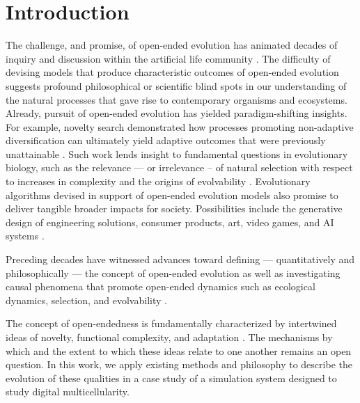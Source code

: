 \section{Introduction}

The challenge, and promise, of open-ended evolution has animated decades of inquiry and discussion within the artificial life community \citep{packard2019overview}.
The difficulty of devising models that produce characteristic outcomes of open-ended evolution suggests profound philosophical or scientific blind spots in our understanding of the natural processes that gave rise to contemporary organisms and ecosystems.
Already, pursuit of open-ended evolution has yielded paradigm-shifting insights.
For example, novelty search demonstrated how processes promoting non-adaptive diversification can ultimately yield adaptive outcomes that were previously unattainable \citep{lehman2011abandoning}. 
Such work lends insight to fundamental questions in evolutionary biology, such as the relevance — or irrelevance – of natural selection with respect to increases in complexity \citep{lehman2012evolution, Lynch8597} and the origins of evolvability \citep{lehman2013evolvability,Kirschner8420}. Evolutionary algorithms devised in support of open-ended evolution models also promise to deliver tangible broader impacts for society. Possibilities include the generative design of engineering solutions, consumer products, art, video games, and AI systems \citep{nguyen2015,stanley2017open}.

Preceding decades have witnessed advances toward defining — quantitatively and philosophically — the concept of open-ended evolution \citep{lehman2012beyond,dolson2019modes,bedau1998classification} as well as investigating causal phenomena that promote open-ended dynamics such as ecological dynamics, selection, and evolvability \citep{dolson2019constructive,soros2014identifying,huizinga2018emergence}.

The concept of open-endedness is fundamentally characterized by intertwined ideas of novelty, functional complexity, and adaptation \citep{}.
The mechanisms by which and the extent to which these ideas relate to one another remains an open question.
In this work, we apply existing methods and philosophy to describe the evolution of these qualities in a case study of a simulation system designed to study digital multicellularity.